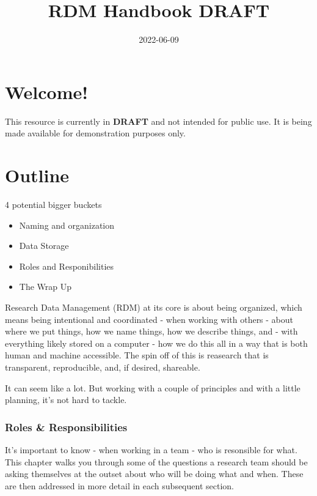 \documentclass[
]{book}
\title{RDM Handbook DRAFT}
\author{}
\date{\vspace{-2.5em}2022-06-09}
\providecommand{\tightlist}{%
  \setlength{\itemsep}{0pt}\setlength{\parskip}{0pt}}
\begin{document}
\maketitle

{
\setcounter{tocdepth}{1}
\tableofcontents
}
\hypertarget{welcome}{%
\chapter*{Welcome!}\label{welcome}}

This resource is currently in \textbf{DRAFT} and not intended for public use. It is being made available for demonstration purposes only.

\hypertarget{outline}{%
\chapter*{Outline}\label{outline}}

4 potential bigger buckets

\begin{itemize}
\tightlist
\item
  Naming and organization
\item
  Data Storage
\item
  Roles and Responibilities
\item
  The Wrap Up
\end{itemize}

Research Data Management (RDM) at its core is about being organized, which means being intentional and coordinated - when working with others - about where we put things, how we name things, how we describe things, and - with everything likely stored on a computer - how we do this all in a way that is both human and machine accessible. The spin off of this is reasearch that is transparent, reproducible, and, if desired, shareable.

It can seem like a lot. But working with a couple of principles and with a little planning, it's not hard to tackle.

\hypertarget{roles-responsibilities}{%
\subsection*{Roles \& Responsibilities}\label{roles-responsibilities}}

It's important to know - when working in a team - who is resonsible for what. This chapter walks you through some of the questions a research team should be asking themselves at the outset about who will be doing what and when. These are then addressed in more detail in each subsequent section.
\end{document}
